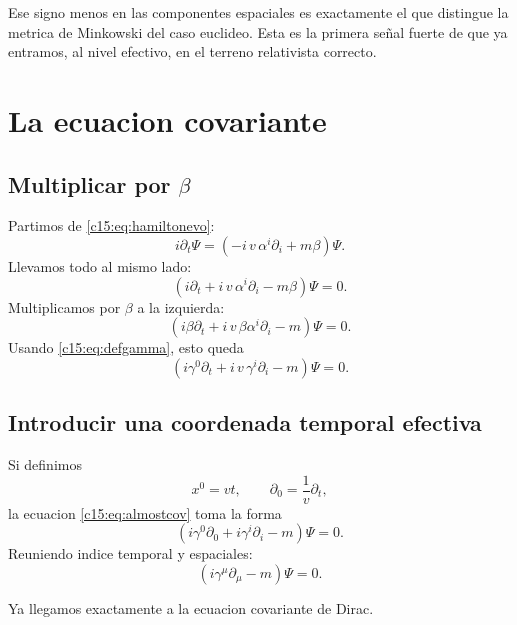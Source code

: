 Ese signo menos en las componentes espaciales es exactamente el que distingue la metrica de Minkowski del caso euclideo. Esta es la primera señal fuerte de que ya entramos, al nivel efectivo, en el terreno relativista correcto.

\section{La ecuacion covariante}
\subsection{\texorpdfstring{Multiplicar por \(\beta\)}{Multiplicar por beta}}
Partimos de \eqref{c15:eq:hamiltonevo}:
\begin{equation}
i\partial_t \Psi =
\left(
-i\,v\,\alpha^i\partial_i + m\beta
\right)\Psi.
\end{equation}
Llevamos todo al mismo lado:
\begin{equation}
\left(
i\partial_t + i\,v\,\alpha^i\partial_i - m\beta
\right)\Psi=0.
\end{equation}
Multiplicamos por $\beta$ a la izquierda:
\begin{equation}
\left(
i\beta\partial_t + i\,v\,\beta\alpha^i\partial_i - m
\right)\Psi=0.
\end{equation}
Usando \eqref{c15:eq:defgamma}, esto queda
\begin{equation}
\left(
i\gamma^0\partial_t + i\,v\,\gamma^i\partial_i - m
\right)\Psi=0.
\label{c15:eq:almostcov}
\end{equation}

\subsection{Introducir una coordenada temporal efectiva}
Si definimos
\begin{equation}
x^0 = v t,
\qquad
\partial_0 = \frac{1}{v}\partial_t,
\end{equation}
la ecuacion \eqref{c15:eq:almostcov} toma la forma
\begin{equation}
\left(
i\gamma^0\partial_0 + i\gamma^i\partial_i - m
\right)\Psi=0.
\end{equation}
Reuniendo indice temporal y espaciales:
\begin{equation}
\boxed{
(i\gamma^\mu\partial_\mu - m)\Psi=0.
}
\label{c15:eq:diraccov}
\end{equation}

Ya llegamos exactamente a la ecuacion covariante de Dirac.

